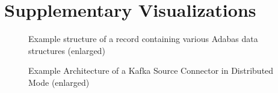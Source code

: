 \chapter{Supplementary Visualizations}

\begin{figure}[htbp]
    \centering
    \caption{Example structure of a record containing various Adabas data structures (enlarged)}
    \label{fig:appendix02:adabasstructure}
\end{figure}

\begin{figure}[htbp]
 \centering
 \caption{Example Architecture of a Kafka Source Connector in Distributed Mode (enlarged)}
 \label{fig:appendix02:kafkaconnectarchitecture}
\end{figure}

